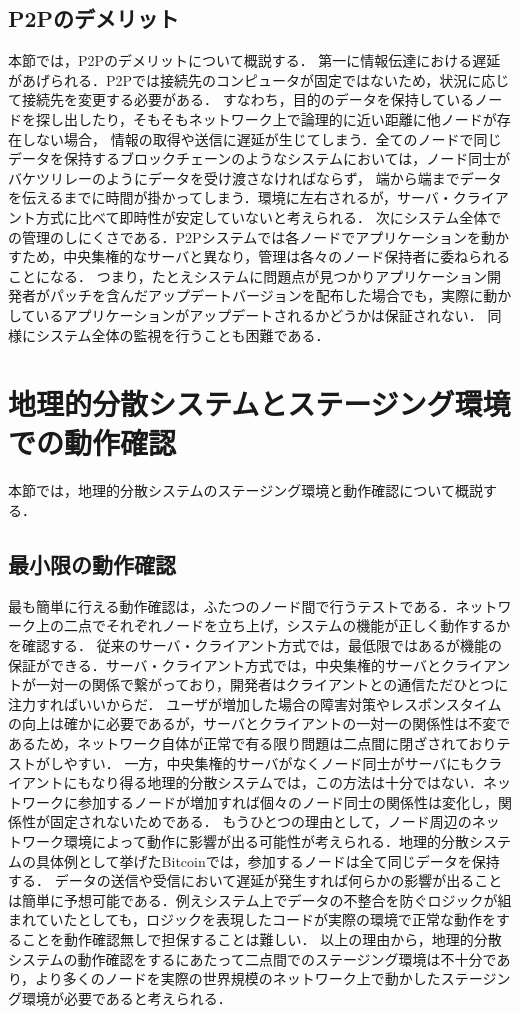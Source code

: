\subsection{P2Pのデメリット}
本節では，P2Pのデメリットについて概説する．
第一に情報伝達における遅延があげられる．P2Pでは接続先のコンピュータが固定ではないため，状況に応じて接続先を変更する必要がある．
すなわち，目的のデータを保持しているノードを探し出したり，そもそもネットワーク上で論理的に近い距離に他ノードが存在しない場合，
情報の取得や送信に遅延が生じてしまう．全てのノードで同じデータを保持するブロックチェーンのようなシステムにおいては，ノード同士がバケツリレーのようにデータを受け渡さなければならず，
端から端までデータを伝えるまでに時間が掛かってしまう．環境に左右されるが，サーバ・クライアント方式に比べて即時性が安定していないと考えられる．
次にシステム全体での管理のしにくさである．P2Pシステムでは各ノードでアプリケーションを動かすため，中央集権的なサーバと異なり，管理は各々のノード保持者に委ねられることになる．
つまり，たとえシステムに問題点が見つかりアプリケーション開発者がパッチを含んだアップデートバージョンを配布した場合でも，実際に動かしているアプリケーションがアップデートされるかどうかは保証されない．
同様にシステム全体の監視を行うことも困難である．

\section{地理的分散システムとステージング環境での動作確認}
\label{background:staging-environment}
本節では，地理的分散システムのステージング環境と動作確認について概説する．

\subsection{最小限の動作確認}
最も簡単に行える動作確認は，ふたつのノード間で行うテストである．ネットワーク上の二点でそれぞれノードを立ち上げ，システムの機能が正しく動作するかを確認する．
従来のサーバ・クライアント方式では，最低限ではあるが機能の保証ができる．サーバ・クライアント方式では，中央集権的サーバとクライアントが一対一の関係で繋がっており，開発者はクライアントとの通信ただひとつに注力すればいいからだ．
ユーザが増加した場合の障害対策やレスポンスタイムの向上は確かに必要であるが，サーバとクライアントの一対一の関係性は不変であるため，ネットワーク自体が正常で有る限り問題は二点間に閉ざされておりテストがしやすい．
一方，中央集権的サーバがなくノード同士がサーバにもクライアントにもなり得る地理的分散システムでは，この方法は十分ではない．ネットワークに参加するノードが増加すれば個々のノード同士の関係性は変化し，関係性が固定されないためである．
もうひとつの理由として，ノード周辺のネットワーク環境によって動作に影響が出る可能性が考えられる．地理的分散システムの具体例として挙げたBitcoinでは，参加するノードは全て同じデータを保持する．
データの送信や受信において遅延が発生すれば何らかの影響が出ることは簡単に予想可能である．例えシステム上でデータの不整合を防ぐロジックが組まれていたとしても，ロジックを表現したコードが実際の環境で正常な動作をすることを動作確認無しで担保することは難しい．
以上の理由から，地理的分散システムの動作確認をするにあたって二点間でのステージング環境は不十分であり，より多くのノードを実際の世界規模のネットワーク上で動かしたステージング環境が必要であると考えられる．

